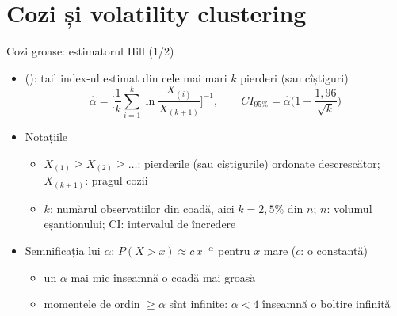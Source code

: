 \section{Cozi și volatility clustering}

\begin{frame}{Cozi groase: estimatorul Hill (1/2)}
\itemsize{\small}
\begin{itemize}
    \item {} (): tail index-ul estimat din cele mai mari $k$ pierderi (sau cîștiguri) \[ \hat\alpha = \Big[\frac1k\sum_{i=1}^k \ln\frac{X_{(i)}}{X_{(k+1)}}\Big]^{-1}, \qquad CI_{95\%} = \hat\alpha\Big(1 \pm \frac{1{,}96}{\sqrt{k}}\Big) \]
    \item Notațiile
    \begin{itemize}
        \item $X_{(1)} \ge X_{(2)} \ge \dots$: pierderile (sau cîștigurile) ordonate descrescător; $X_{(k+1)}$: pragul cozii
        \item $k$: numărul observațiilor din coadă, aici $k = 2{,}5\%$ din $n$; $n$: volumul eșantionului; CI: intervalul de încredere
    \end{itemize}
    \item Semnificația lui $\alpha$: $P(X > x) \approx c\,x^{-\alpha}$ pentru $x$ mare ($c$: o constantă)
    \begin{itemize}
        \item un $\alpha$ mai mic înseamnă o coadă mai groasă
        \item momentele de ordin $\ge \alpha$ sînt infinite: $\alpha < 4$ înseamnă o boltire infinită
    \end{itemize}
\end{itemize}
\end{frame}

